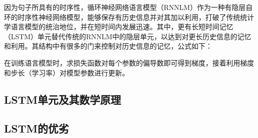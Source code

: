 因为句子所具有的时序性，循环神经网络语言模型（RNNLM）作为一种有隐层自环的时序性神经网络模型，能够保存有历史信息并对其加以利用，打破了传统统计学语言模型的统治地位，并在短时间内发展迅速。其中，更有长短时间记忆（LSTM）单元替代传统的RNNLM中的隐层单元，以达到对更长历史信息的记忆和利用。其结构中有很多的门来控制对历史信息的记忆，公式如下：


在训练语言模型时，求损失函数对每个参数的偏导数即可得到梯度，接着利用梯度和步长（学习率）对模型参数进行更新。

\subsection{LSTM单元及其数学原理}

\subsection{LSTM的优劣}



